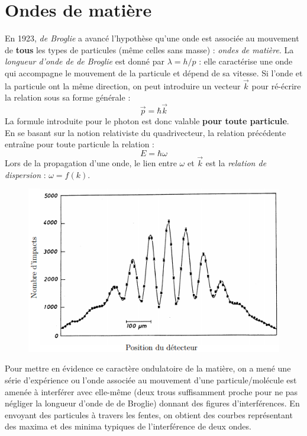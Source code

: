 \documentclass	[11pt, a4paper, openany]{book}
\begin{document}
	\section{Ondes de matière}
	En 1923, \textit{de Broglie} a avancé l'hypothèse qu'une onde est associée au mouvement de \textbf{tous} les types de particules (même celles sans masse) : \textit{ondes de matière}. La \textit{longueur d'onde de de Broglie} est donné par $\lambda = h/p$ : elle caractérise une onde qui accompagne le mouvement de la particule et dépend de sa vitesse. Si l'onde et la particule ont la même direction, on peut introduire un vecteur $\vec{k}$ pour ré-écrire la relation sous sa forme générale :
	\begin{equation}
		\vec p = \hbar \vec{k}
	\end{equation}
	La formule introduite pour le photon est donc valable \textbf{pour toute particule}.\\
	En se basant sur la notion relativiste du quadrivecteur, la relation précédente entraîne pour toute particule la relation :
	\begin{equation}
		E = \hbar\omega
	\end{equation}
	Lors de la propagation d'une onde, le lien entre $\omega$ et $\vec{k}$ est la \textit{relation de dispersion} : $\omega = f(k)$.\\
	
	\begin{figure}
		\includegraphics[scale=0.3]{img/image3.png}
	\end{figure}
	Pour mettre en évidence ce caractère ondulatoire de la matière, on a mené une série d'expérience ou l'onde associée au mouvement d'une particule/molécule est amenée à interférer avec elle-même (deux trous suffisamment proche pour ne pas négliger la longueur d'onde de de Broglie) donnant des figures d'interférences. En envoyant des particules à travers les fentes, on obtient des courbes représentant des maxima et des minima typiques de l’interférence de deux ondes.\\
	
\end{document}
